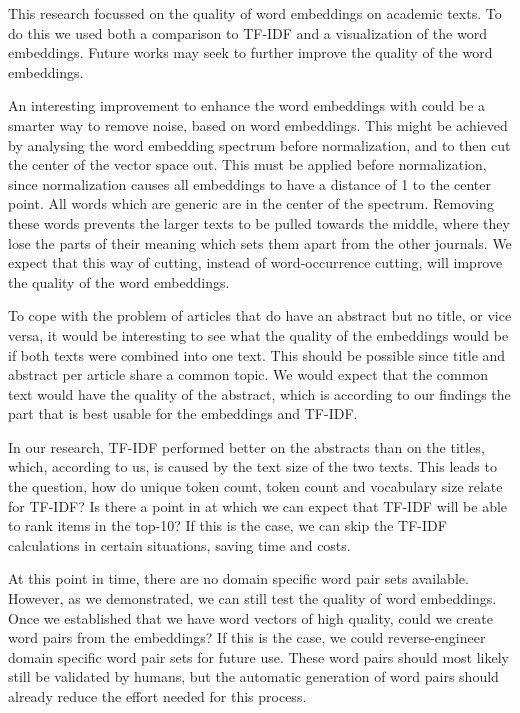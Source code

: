 \documentclass[../../Thesis.tex]{subfiles}
\begin{document}
This research focussed on the quality of word embeddings on academic texts. To do this we used both a comparison to TF-IDF and a visualization of the word embeddings. Future works may seek to further improve the quality of the word embeddings. 

An interesting improvement to enhance the word embeddings with could be a smarter way to remove noise, based on word embeddings. This might be achieved by analysing the word embedding spectrum before normalization, and to then cut the center of the vector space out. This must be applied before normalization, since normalization causes all embeddings to have a distance of 1 to the center point. All words which are generic are in the center of the spectrum. Removing these words prevents the larger texts to be pulled towards the middle, where they lose the parts of their meaning which sets them apart from the other journals. We expect that this way of cutting, instead of word-occurrence cutting, will improve the quality of the word embeddings.

To cope with the problem of articles that do have an abstract but no title, or vice versa, it would be interesting to see what the quality of the embeddings would be if both texts were combined into one text. This should be possible since title and abstract per article share a common topic. We would expect that the common text would have the quality of the abstract, which is according to our findings the part that is best usable for the embeddings and TF-IDF.

In our research, TF-IDF performed better on the abstracts than on the titles, which, according to us, is caused by the text size of the two texts. This leads to the question, how do unique token count, token count and vocabulary size relate for TF-IDF? Is there a point in at which we can expect that TF-IDF will be able to rank items in the top-10? If this is the case, we can skip the TF-IDF calculations in certain situations, saving time and costs.

At this point in time, there are no domain specific word pair sets available. However, as we demonstrated, we can still test the quality of word embeddings. Once we established that we have word vectors of high quality, could we create word pairs from the embeddings? If this is the case, we could reverse-engineer domain specific word pair sets for future use. These word pairs should most likely still be validated by humans, but the automatic generation of word pairs should already reduce the effort needed for this process.
\end{document}
